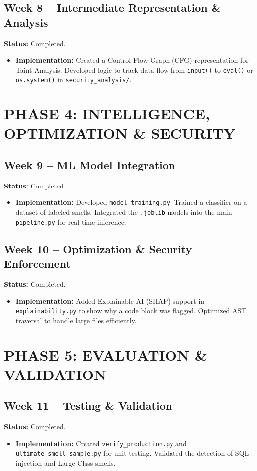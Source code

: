 \documentclass[12pt,a4paper]{article}
\begin{document}
\subsection{Week 8 -- Intermediate Representation \& Analysis}
\textbf{Status:} \textcolor{statuscolor}{Completed}.
\begin{itemize}
    \item \textbf{Implementation:} Created a Control Flow Graph (CFG) representation for Taint Analysis. Developed logic to track data flow from \texttt{input()} to \texttt{eval()} or \texttt{os.system()} in \texttt{security\_analysis/}.
\end{itemize}

\section{PHASE 4: INTELLIGENCE, OPTIMIZATION \& SECURITY}

\subsection{Week 9 -- ML Model Integration}
\textbf{Status:} \textcolor{statuscolor}{Completed}.
\begin{itemize}
    \item \textbf{Implementation:} Developed \texttt{model\_training.py}. Trained a classifier on a dataset of labeled smells. Integrated the \texttt{.joblib} models into the main \texttt{pipeline.py} for real-time inference.
\end{itemize}

\subsection{Week 10 -- Optimization \& Security Enforcement}
\textbf{Status:} \textcolor{statuscolor}{Completed}. 
\begin{itemize}
    \item \textbf{Implementation:} Added Explainable AI (SHAP) support in \texttt{explainability.py} to show why a code block was flagged. Optimized AST traversal to handle large files efficiently.
\end{itemize}

\section{PHASE 5: EVALUATION \& VALIDATION}

\subsection{Week 11 -- Testing \& Validation}
\textbf{Status:} \textcolor{statuscolor}{Completed}.
\begin{itemize}
    \item \textbf{Implementation:} Created \texttt{verify\_production.py} and \texttt{ultimate\_smell\_sample.py} for unit testing. Validated the detection of SQL injection and Large Class smells.
\end{itemize}
\end{document}

